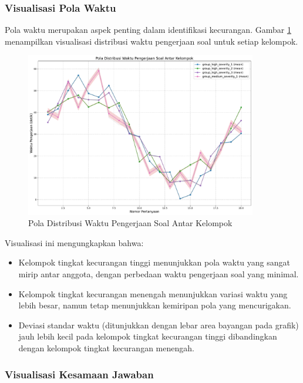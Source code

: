 \subsubsection{Visualisasi Pola Waktu}

Pola waktu merupakan aspek penting dalam identifikasi kecurangan. Gambar \ref{fig:timing_patterns} menampilkan visualisasi distribusi waktu pengerjaan soal untuk setiap kelompok.

\begin{figure}[htbp]
    \centering
    \includegraphics[width=0.9\textwidth]{figures/timing_patterns.pdf}
    \caption{Pola Distribusi Waktu Pengerjaan Soal Antar Kelompok}
    \label{fig:timing_patterns}
\end{figure}

Visualisasi ini mengungkapkan bahwa:
\begin{itemize}
    \item Kelompok tingkat kecurangan tinggi menunjukkan pola waktu yang sangat mirip antar anggota, dengan perbedaan waktu pengerjaan soal yang minimal.
    \item Kelompok tingkat kecurangan menengah menunjukkan variasi waktu yang lebih besar, namun tetap menunjukkan kemiripan pola yang mencurigakan.
    \item Deviasi standar waktu (ditunjukkan dengan lebar area bayangan pada grafik) jauh lebih kecil pada kelompok tingkat kecurangan tinggi dibandingkan dengan kelompok tingkat kecurangan menengah.
\end{itemize}

\subsubsection{Visualisasi Kesamaan Jawaban}

